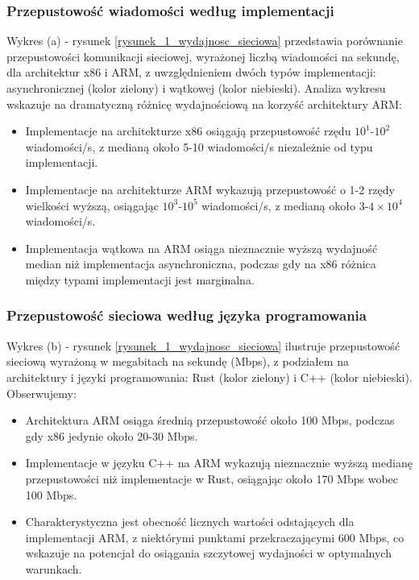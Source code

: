 \subsubsection{Przepustowość wiadomości według implementacji}
Wykres (a) - rysunek \ref{rysunek_1_wydajnosc_sieciowa} przedstawia porównanie przepustowości komunikacji sieciowej, wyrażonej liczbą wiadomości na sekundę, dla architektur x86 i ARM, z uwzględnieniem dwóch typów implementacji: asynchronicznej (kolor zielony) i wątkowej (kolor niebieski). Analiza wykresu wskazuje na dramatyczną różnicę wydajnościową na korzyść architektury ARM:
\begin{itemize}
    \item Implementacje na architekturze x86 osiągają przepustowość rzędu $10^1$-$10^2$ wiadomości/s, z medianą około 5-10 wiadomości/s niezależnie od typu implementacji.
    \item Implementacje na architekturze ARM wykazują przepustowość o 1-2 rzędy wielkości wyższą, osiągając $10^3$-$10^5$ wiadomości/s, z medianą około $3$-$4\times10^4$ wiadomości/s.
    \item Implementacja wątkowa na ARM osiąga nieznacznie wyższą wydajność median niż implementacja asynchroniczna, podczas gdy na x86 różnica między typami implementacji jest marginalna.
\end{itemize}

\subsubsection{Przepustowość sieciowa według języka programowania}
Wykres (b) - rysunek \ref{rysunek_1_wydajnosc_sieciowa} ilustruje przepustowość sieciową wyrażoną w megabitach na sekundę (Mbps), z podziałem na architektury i języki programowania: Rust (kolor zielony) i C++ (kolor niebieski). Obserwujemy:
\begin{itemize}
    \item Architektura ARM osiąga średnią przepustowość około 100 Mbps, podczas gdy x86 jedynie około 20-30 Mbps.
    \item Implementacje w języku C++ na ARM wykazują nieznacznie wyższą medianę przepustowości niż implementacje w Rust, osiągając około 170 Mbps wobec 100 Mbps.
    \item Charakterystyczna jest obecność licznych wartości odstających dla implementacji ARM, z niektórymi punktami przekraczającymi 600 Mbps, co wskazuje na potencjał do osiągania szczytowej wydajności w optymalnych warunkach.
\end{itemize}


